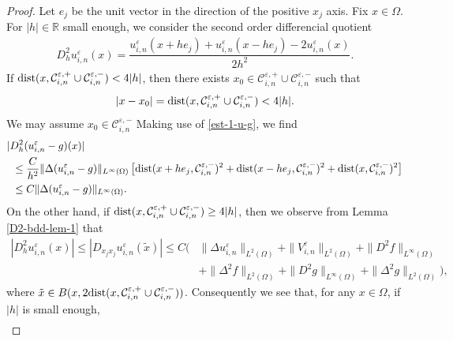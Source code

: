 \documentclass[12pt]{amsart}
\begin{document}
\begin{proof}
Let $e_j$ be the unit vector in the direction of the positive $x_j$ axis. 
Fix $x \in \Omega$. For $|h| \in {\mathbb{R}}$ small enough, we consider the second order differencial quotient  
\begin{align*}
D^{2}_{h} u^{\varepsilon}_{i,n}(x) = \dfrac{u^{\varepsilon}_{i,n}(x + h e_j) + u^{\varepsilon}_{i,n}(x - h e_j) - 2 u^{\varepsilon}_{i,n}(x)}{2 h^{2}}. 
\end{align*}
If ${\rm dist}(x, {\mathcal{C}}^{{\varepsilon},+}_{i,n} \cup {\mathcal{C}}^{{\varepsilon},-}_{i,n}) < 4 |h|$, 
then there exists $x_0 \in {\mathcal{C}}^{{\varepsilon},+}_{i,n} \cup {\mathcal{C}}^{{\varepsilon},-}_{i,n}$ such that 
\begin{align*}
|x - x_{0} | =  {\rm dist}(x, {\mathcal{C}}^{{\varepsilon},+}_{i,n} \cup {\mathcal{C}}^{{\varepsilon},-}_{i,n}) < 4 |h|. 
\end{align*}
We may assume $x_0 \in {\mathcal{C}}^{{\varepsilon},-}_{i,n}$
Making use of \eqref{est-1-u-g}, we find 
\begin{align*}
& | D^{2}_{h} (u^{\varepsilon}_{i,n} - g)(x)| \\
& \,\,\, \le \dfrac{C}{h^2} \| \Delta (u^{\varepsilon}_{i,n} - g) \|_{L^{\infty}(\Omega)} 
 \left[ {\rm dist}(x+h e_{j},{\mathcal{C}}^{{\varepsilon},-}_{i,n})^{2} + {\rm dist}(x-h e_{j},{\mathcal{C}}^{{\varepsilon},-}_{i,n})^{2} 
         + {\rm dist}(x,{\mathcal{C}}^{{\varepsilon},-}_{i,n})^{2} \right]\\
& \,\,\, \le C \| \Delta (u^{\varepsilon}_{i,n} - g) \|_{L^{\infty}(\Omega)}. 
\end{align*}
On the other hand, if ${\rm dist}(x, {\mathcal{C}}^{{\varepsilon},+}_{i,n} \cup {\mathcal{C}}^{{\varepsilon},-}_{i,n}) \ge 4 |h|$, 
then we observe from Lemma \ref{D2-bdd-lem-1} that 
\begin{align*}
| D^{2}_{h} u^{\varepsilon}_{i,n}(x) | \le | D_{x_{j} x_{j}} u^{\varepsilon}_{i,n}(\tilde{x}) |
 \le C ( & \| \Delta u^{\varepsilon}_{i,n} \|_{L^{2}(\Omega)} + \| V^{\varepsilon}_{i,n} \|_{L^{2}(\Omega)} + \| D^{2} f \|_{L^{\infty}(\Omega)}\\ 
  &  + \| \Delta^{2} f \|_{L^{2}(\Omega)} + \| D^{2} g \|_{L^{\infty}(\Omega)} + \| \Delta^{2} g \|_{L^{2}(\Omega)}), 
\end{align*}
where $\tilde{x} \in B(x, 2 {\rm dist}(x, {\mathcal{C}}^{{\varepsilon},+}_{i,n} \cup {\mathcal{C}}^{{\varepsilon},-}_{i,n}))$. 
Consequently we see that, for any $x \in \Omega$, if $|h|$ is small enough, 
\begin{align*}

\end{align*}
\end{proof}
\end{document}
